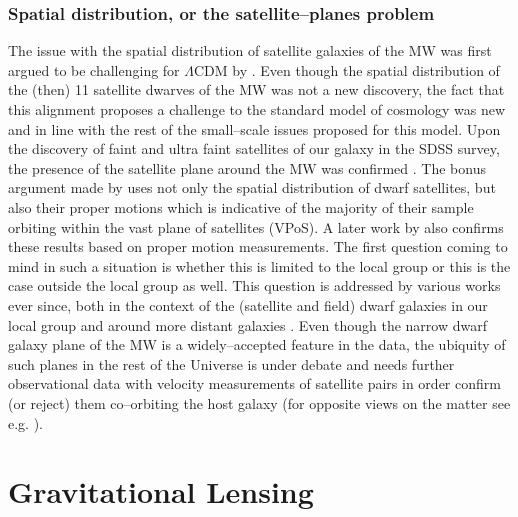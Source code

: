 \documentclass[a4wide,12pt]{book}
\newcommand{\ignore}[1]{}
\begin{document}
\subsection{Spatial distribution, or the satellite--planes problem}
The issue with the spatial distribution of satellite galaxies of the MW was first argued to be challenging for $\Lambda$CDM by \citet[][]{Kroupa+2005}. Even though the spatial distribution of the (then) 11 satellite dwarves of the MW was not a new discovery, the fact that this alignment proposes a challenge to the standard model of cosmology was new and in line with the rest of the small--scale issues proposed for this model\ignore{ (see Figure \ref{fig:sat_plane})}. Upon the discovery of faint and ultra faint satellites of our galaxy in the SDSS survey, the presence of the satellite plane around the MW was confirmed \citep[][]{Metz+2009, Kroupa+2010}. The bonus argument made by \citet[][]{Metz+2009} uses not only the spatial distribution of dwarf satellites, but also their proper motions which is indicative of the majority of their sample orbiting within the vast plane of satellites (VPoS). A later work by \citet[][]{Pawlowski+2013} also confirms these results based on proper motion measurements. The first question coming to mind in such a situation is whether this is limited to the local group or this is the case outside the local group as well. This question is addressed by various works ever since, both in the context of the (satellite and field) dwarf galaxies in our local group \citep[see e.g. ][]{Ibata+2013, Pawlowski+2013, Bellazzini+2013, Pawlowski.McGaugh2014} and around more distant galaxies \citep[see e.g. ][]{Tully+2015, Muller+2015}. Even though the narrow dwarf galaxy plane of the MW is a widely--accepted feature in the data, the ubiquity of such planes in the rest of the Universe is under debate and needs further observational data with velocity measurements of satellite pairs in order confirm (or reject) them co--orbiting the host galaxy (for opposite views on the matter see e.g. \citealt[][]{Phillips+2015, Cautun+2015}).


\chapter{Gravitational Lensing}
\label{sec:Gravitational lensing}
\end{document}
